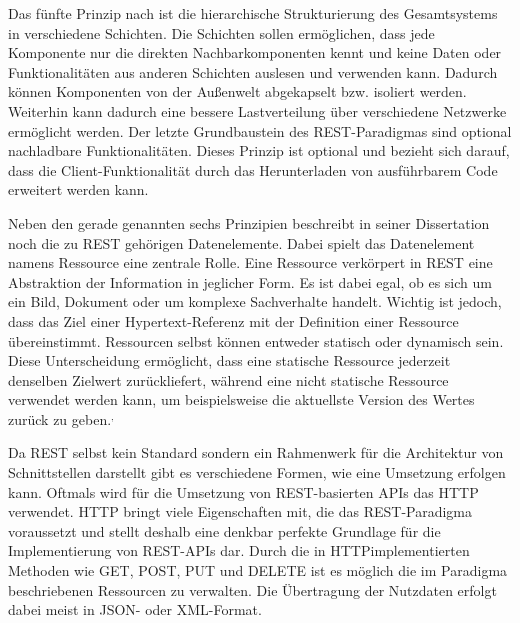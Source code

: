 Das fünfte Prinzip nach \citeauthor{MS-Fielding.} ist die hierarchische Strukturierung des Gesamtsystems in verschiedene Schichten. 
Die Schichten sollen ermöglichen, dass jede Komponente nur die direkten Nachbarkomponenten kennt und keine Daten oder Funktionalitäten aus anderen Schichten auslesen und verwenden kann.
Dadurch können Komponenten von der Außenwelt abgekapselt bzw. isoliert werden.
Weiterhin kann dadurch eine bessere Lastverteilung über verschiedene Netzwerke ermöglicht werden.
Der letzte Grundbaustein des \ac{REST}-Paradigmas sind optional nachladbare Funktionalitäten.
Dieses Prinzip ist optional und bezieht sich darauf, dass die Client-Funktionalität durch das Herunterladen von ausführbarem Code erweitert werden kann. 

Neben den gerade genannten sechs Prinzipien beschreibt \citeauthor{MS-Fielding.} in seiner Dissertation noch die zu \ac{REST} gehörigen Datenelemente. 
Dabei spielt das Datenelement namens Ressource eine zentrale Rolle.
Eine Ressource verkörpert in \ac{REST} eine Abstraktion der Information in jeglicher Form.
Es ist dabei egal, ob es sich um ein Bild, Dokument oder um komplexe Sachverhalte handelt. 
Wichtig ist jedoch, dass das Ziel einer Hypertext-Referenz mit der Definition einer Ressource übereinstimmt.
Ressourcen selbst können entweder statisch oder dynamisch sein.
Diese Unterscheidung ermöglicht, dass eine statische Ressource jederzeit denselben Zielwert zurückliefert, während eine nicht statische Ressource verwendet werden kann, um beispielsweise die aktuellste Version des Wertes zurück zu geben.\autocite[Vgl.][S. 86-90]{MS-Fielding.}$^,$\autocite{rf-richardson2013restful}

Da \ac{REST} selbst kein Standard sondern ein Rahmenwerk für die Architektur von Schnittstellen darstellt gibt es verschiedene Formen, wie eine Umsetzung erfolgen kann. 
Oftmals wird für die Umsetzung von \ac{REST}-basierten \acp{API} das \ac{HTTP} verwendet.
\ac{HTTP} bringt viele Eigenschaften mit, die das \ac{REST}-Paradigma voraussetzt und stellt deshalb eine denkbar perfekte Grundlage für die Implementierung von \ac{REST}-\acp{API} dar. 
Durch die in \ac{HTTP}implementierten Methoden wie GET, POST, PUT und DELETE ist es möglich die im Paradigma beschriebenen Ressourcen zu verwalten.
Die Übertragung der Nutzdaten erfolgt dabei meist in \ac{JSON}- oder \ac{XML}-Format.\autocite[Vgl.][S. 97]{MS-Tilkov.2015} 

